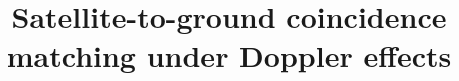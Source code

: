 \documentclass{article}
\begin{document}
\title{\vspace{-2.0cm} Satellite-to-ground coincidence matching under Doppler effects}
\maketitle






\end{document}
